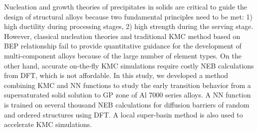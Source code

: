 \begin{comment}
\begingroup
\begin{figure}[!ht]
  \centering
  \subfigure[]{\texttt{[image: ]}}\label{Chap:Al/Vac:fig:}
  \subfigure[]{\texttt{[image: ]}}\label{Chap:Al/Vac:fig:}
\caption[]{}
  \label{Chap:Al/Vac:fig}
\end{figure}
\endgroup
\end{comment}

Nucleation and growth theories of precipitates in solids are critical to guide the design of structural alloys because two fundamental principles need to be met: 1) high ductility during processing stages, 2) high strength during the serving stage. However, classical nucleation theories and traditional \ac{KMC} method based on \acf{BEP} relationship fail to provide quantitative guidance for the development of multi-component alloys because of the large number of element types. On the other hand, accurate on-the-fly \ac{KMC} simulations require costly \ac{NEB} calculations from \ac{DFT}, which is not affordable. In this study, we developed a method combining \ac{KMC} and \ac{NN} functions to study the early transition behavior from a supersaturated solid solution to \ac{GP} zone of Al 7000 series alloys. A \ac{NN} function is trained on several thousand \ac{NEB} calculations for diffusion barriers of random and ordered structures using \ac{DFT}. A local super-basin method is also used to accelerate \ac{KMC} simulations.






